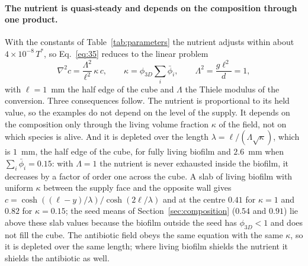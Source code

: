 \documentclass[11pt,a4paper]{article}
\newcommand{\phiD}{\phi_{3D}}
\newcommand{\lv}{\textstyle\sum_i\bar\phi_i}
\begin{document}
\paragraph{The nutrient is quasi-steady and depends on the composition through one product.} With the constants of Table~\ref{tab:parameters} the nutrient adjusts within about $4\times10^{-8}\,T^*$, so Eq.~\eqref{eq:35} reduces to the linear problem
\begin{equation}
\nabla^2 c=\frac{\Lambda^2}{\ell^2}\,\kappa\,c,\qquad \kappa=\phiD\lv,\qquad \Lambda^2=\frac{g\ell^2}{d}=1,
\label{eq:thiele}
\end{equation}
with $\ell=1$~mm the half edge of the cube and $\Lambda$ the Thiele modulus of the conversion. Three consequences follow. The nutrient is proportional to its held value, so the examples do not depend on the level of the supply. It depends on the composition only through the living volume fraction $\kappa$ of the field, not on which species is alive. And it is depleted over the length $\lambda=\ell/(\Lambda\sqrt\kappa)$, which is $1$~mm, the half edge of the cube, for fully living biofilm and $2.6$~mm when $\lv=0.15$: with $\Lambda=1$ the nutrient is never exhausted inside the biofilm, it decreases by a factor of order one across the cube. A slab of living biofilm with uniform $\kappa$ between the supply face and the opposite wall gives $c=\cosh((\ell-y)/\lambda)/\cosh(2\ell/\lambda)$ and at the centre $0.41$ for $\kappa=1$ and $0.82$ for $\kappa=0.15$; the seed means of Section~\ref{sec:composition} ($0.54$ and $0.91$) lie above these slab values because the biofilm outside the seed has $\phiD<1$ and does not fill the cube. The antibiotic field obeys the same equation with the same $\kappa$, so it is depleted over the same length; where living biofilm shields the nutrient it shields the antibiotic as well.
\end{document}
